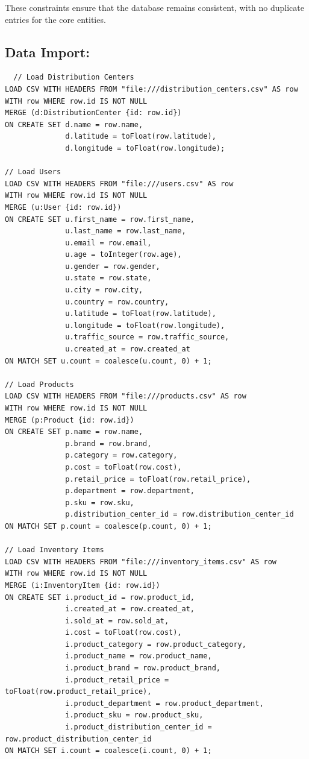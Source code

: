 \documentclass[a4paper,12pt]{article}
\begin{document}
\par These constraints ensure that the database remains consistent, with no duplicate entries for the core entities.

\subsection{Data Import:}
\begin{verbatim}
  // Load Distribution Centers
LOAD CSV WITH HEADERS FROM "file:///distribution_centers.csv" AS row
WITH row WHERE row.id IS NOT NULL
MERGE (d:DistributionCenter {id: row.id})
ON CREATE SET d.name = row.name,
              d.latitude = toFloat(row.latitude),
              d.longitude = toFloat(row.longitude);

// Load Users
LOAD CSV WITH HEADERS FROM "file:///users.csv" AS row
WITH row WHERE row.id IS NOT NULL
MERGE (u:User {id: row.id})
ON CREATE SET u.first_name = row.first_name,
              u.last_name = row.last_name,
              u.email = row.email,
              u.age = toInteger(row.age),
              u.gender = row.gender,
              u.state = row.state,
              u.city = row.city,
              u.country = row.country,
              u.latitude = toFloat(row.latitude),
              u.longitude = toFloat(row.longitude),
              u.traffic_source = row.traffic_source,
              u.created_at = row.created_at
ON MATCH SET u.count = coalesce(u.count, 0) + 1;

// Load Products
LOAD CSV WITH HEADERS FROM "file:///products.csv" AS row
WITH row WHERE row.id IS NOT NULL
MERGE (p:Product {id: row.id})
ON CREATE SET p.name = row.name,
              p.brand = row.brand,
              p.category = row.category,
              p.cost = toFloat(row.cost),
              p.retail_price = toFloat(row.retail_price),
              p.department = row.department,
              p.sku = row.sku,
              p.distribution_center_id = row.distribution_center_id
ON MATCH SET p.count = coalesce(p.count, 0) + 1;

// Load Inventory Items
LOAD CSV WITH HEADERS FROM "file:///inventory_items.csv" AS row
WITH row WHERE row.id IS NOT NULL
MERGE (i:InventoryItem {id: row.id})
ON CREATE SET i.product_id = row.product_id,
              i.created_at = row.created_at,
              i.sold_at = row.sold_at,
              i.cost = toFloat(row.cost),
              i.product_category = row.product_category,
              i.product_name = row.product_name,
              i.product_brand = row.product_brand,
              i.product_retail_price = toFloat(row.product_retail_price),
              i.product_department = row.product_department,
              i.product_sku = row.product_sku,
              i.product_distribution_center_id = row.product_distribution_center_id
ON MATCH SET i.count = coalesce(i.count, 0) + 1;


\end{verbatim}
\end{document}
